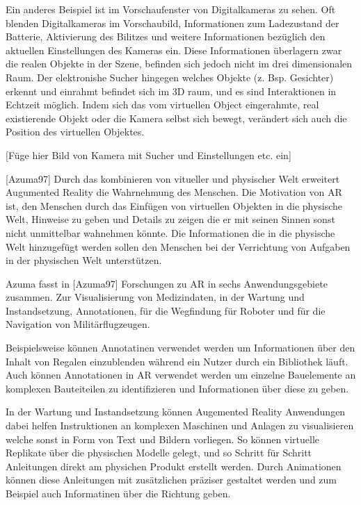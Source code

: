 Ein anderes Beispiel ist im Vorschaufenster von Digitalkameras zu sehen. Oft blenden Digitalkameras im Vorschaubild, Informationen zum Ladezustand der Batterie, Aktivierung des Bilitzes und weitere 
Informationen bezüglich den aktuellen Einstellungen des Kameras ein. Diese Informationen überlagern zwar die realen Objekte in der Szene, befinden sich jedoch nicht im drei dimensionalen Raum. 
Der elektronishe Sucher hingegen welches Objekte (z. Bsp. Gesichter) erkennt und einrahmt befindet sich im 3D raum, und es sind Interaktionen in Echtzeit möglich. Indem sich das vom virtuellen  Object 
eingerahmte, real existierende Objekt oder die Kamera selbst sich bewegt, verändert sich auch die Position des virtuellen Objektes. 

[Füge hier Bild von Kamera mit Sucher und Einstellungen etc. ein]

[Azuma97] Durch das kombinieren von vitueller und physischer Welt erweitert Augumented Reality die Wahrnehmung des Menschen. Die Motivation von AR ist, den Menschen durch das Einfügen
von virtuellen Objekten in die physische Welt, Hinweise zu geben und Details zu zeigen die er mit seinen Sinnen sonst nicht unmittelbar wahnehmen könnte. Die Informationen die in die physische 
Welt hinzugefügt werden sollen den Menschen bei der Verrichtung von Aufgaben in der physischen Welt unterstützen.

Azuma fasst in [Azuma97]  Forschungen zu AR in sechs Anwendungsgebiete zusammen. Zur Visualisierung von Medizindaten, in der Wartung 
und Instandsetzung, Annotationen, für die Wegfindung für Roboter und für die Navigation von Militärflugzeugen. 

Beispielsweise können Annotatinen verwendet werden um Informationen über den Inhalt von Regalen einzublenden während ein Nutzer durch ein Bibliothek läuft. %
Auch können Annotationen in AR verwendet werden um einzelne Bauelemente an komplexen Bauteiteilen zu identifizieren und Informationen über diese zu geben. 

In der Wartung und Instandsetzung können Augemented Reality Anwendungen dabei helfen Instruktionen an komplexen Maschinen und Anlagen zu visualisieren welche sonst in 
Form von Text und Bildern vorliegen. So können virtuelle Replikate über die physischen Modelle gelegt, und so Schritt für Schritt Anleitungen direkt am physichen Produkt erstellt werden. 
Durch Animationen können diese Anleitungen mit zusätzlichen präziser gestaltet werden und zum Beispiel auch Informatinen  über die Richtung geben. 

